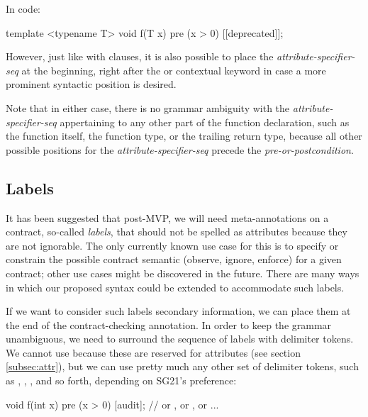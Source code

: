In code:

\vspace{2mm}
\begin{codeblock}
template <typename T>
void f(T x)
  pre (x > 0) [[deprecated]];
\end{codeblock}
\vspace{2mm}

However, just like with  clauses, it is also possible to place the \emph{attribute-specifier-seq} at the beginning, right after the  or  contextual keyword in case a more prominent syntactic position is desired.

Note that in either case, there is no grammar ambiguity with the \emph{attribute-specifier-seq} appertaining to any other part of the function declaration, such as the function itself, the function type, or the trailing return type, because all other possible positions for the \emph{attribute-specifier-seq} precede the \emph{pre-or-postcondition}.


\subsection{Labels}
\label{subsec:labels}

It has been suggested that post-MVP, we will need meta-annotations on a contract, so-called \emph{labels}, that should not be spelled as attributes because they are not ignorable. The only currently known use case for this is to specify or constrain the possible contract semantic (observe, ignore, enforce) for a given contract; other use cases might be discovered in the future. There are many ways in which our proposed syntax could be extended to accommodate such labels.

If we want to consider such labels secondary information, we can place them at the end of the contract-checking annotation. In order to keep the grammar unambiguous, we need to surround the sequence of labels with delimiter tokens. We cannot use \tcode{[[ ... ]]} because these are reserved for attributes (see section \ref{subsec:attr}), but we can use pretty much any other set of delimiter tokens, such as \mbox{\tcode{[ ...]}}, \mbox{}, \mbox{}, and so forth, depending on SG21's preference:

\vspace{2mm}
\begin{codeblock}
void f(int x)
  pre (x > 0) [audit];   // or , or , or \tcode{[\{audit\}]} ...
\end{codeblock}
\vspace{2mm}

